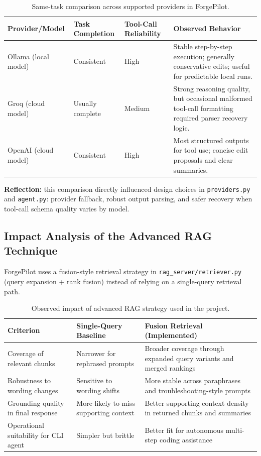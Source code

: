 \documentclass[11pt, letterpaper]{article}
\begin{document}
\begin{table}[H]
\centering\small
\begin{tabularx}{\textwidth}{@{}l l l X@{}}
\toprule
\textbf{Provider/Model} & \textbf{Task Completion} & \textbf{Tool-Call Reliability} & \textbf{Observed Behavior} \\
\midrule
Ollama (local model) & Consistent & High & Stable step-by-step execution; generally conservative edits; useful for predictable local runs. \\
Groq (cloud model) & Usually complete & Medium & Strong reasoning quality, but occasional malformed tool-call formatting required parser recovery logic. \\
OpenAI (cloud model) & Consistent & High & Most structured outputs for tool use; concise edit proposals and clear summaries. \\
\bottomrule
\end{tabularx}
\caption{Same-task comparison across supported providers in ForgePilot.}
\end{table}

\textbf{Reflection:} this comparison directly influenced design choices in
\texttt{providers.py} and \texttt{agent.py}: provider fallback, robust output parsing,
and safer recovery when tool-call schema quality varies by model.

\subsection{Impact Analysis of the Advanced RAG Technique}

ForgePilot uses a fusion-style retrieval strategy in \texttt{rag\_server/retriever.py}
(query expansion + rank fusion) instead of relying on a single-query retrieval path.

\begin{table}[H]
\centering\small
\begin{tabularx}{\textwidth}{@{}l l X@{}}
\toprule
\textbf{Criterion} & \textbf{Single-Query Baseline} & \textbf{Fusion Retrieval (Implemented)} \\
\midrule
Coverage of relevant chunks & Narrower for rephrased prompts & Broader coverage through expanded query variants and merged rankings \\
Robustness to wording changes & Sensitive to wording shifts & More stable across paraphrases and troubleshooting-style prompts \\
Grounding quality in final response & More likely to miss supporting context & Better supporting context density in returned chunks and summaries \\
Operational suitability for CLI agent & Simpler but brittle & Better fit for autonomous multi-step coding assistance \\
\bottomrule
\end{tabularx}
\caption{Observed impact of advanced RAG strategy used in the project.}
\end{table}
\end{document}
